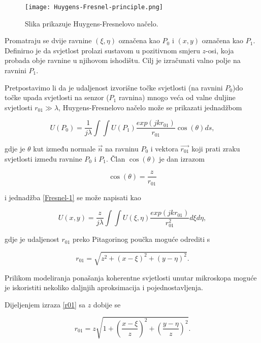 \documentclass[times, utf8, diplomski, numeric]{fer}
\begin{document}
\begin{figure}[h]
	\texttt{[image: Huygens-Fresnel-principle.png]}
	\centering
	\caption{Slika prikazuje Huygens-Fresnelovo načelo.}
	\label{Huygens-Fresnel-principle}
\end{figure}

Promatraju se dvije ravnine $(\xi,\eta)$ označena kao $P_0$ i $(x,y)$ označena kao $P_1$. Definirno je da svjetlost prolazi sustavom u pozitivnom smjeru $z$-osi, koja probada obje ravnine u njihovom ishodištu. Cilj je izračunati valno polje na ravnini $P_1$. 

Pretpostavimo li da je udaljenost izvorišne točke svjetlosti (na ravnini $P_0$)do točke upada svjetlosti na senzor ($P_1$ ravnina) mnogo veća od valne duljine svjetlosti $r_{01} \gg \lambda$, Huygens-Fresnelovo načelo može se prikazati jednadžbom

\begin{equation}
	\label{Fresnel-1}
	U(P_0) = \frac{1}{j\lambda}\int\int U(P_1)\frac{exp(jkr_{01})}{r_{01}}\cos(\theta)ds,
\end{equation}

gdje je $\theta$ kut između normale $\vec{n}$ na ravninu $P_0$ i vektora $\vec{r_{01}}$ koji prati zraku svjetlosti između ravnine $P_0$ i $P_1$. 
Član $\cos(\theta)$ je dan izrazom

\begin{equation}
	\label{cos_theta}
	\cos(\theta) = \frac{z}{r_{01}}
\end{equation}

i jednadžba \ref{Fresnel-1} se može napisati kao

\begin{equation}
\label{Fresnel-2}
U(x,y) = \frac{z}{j\lambda}\int\int U(\xi,\eta)\frac{exp(jkr_{01})}{r_{01}^2}d\xi d\eta,
\end{equation}

gdje je udaljenost $r_{01}$ preko Pitagorinog poučka moguće odrediti s

\begin{equation}
\label{r01}
r_{01} = \sqrt{z^2 + (x - \xi)^2 + (y - \eta)^2}.
\end{equation}

Prilikom modeliranja ponašanja koherentne svjetlosti unutar mikroskopa moguće je iskoristiti nekoliko daljnjih aproksimacija i pojednostavljenja. 

Dijeljenjem izraza \ref{r01} sa $z$ dobije se

\begin{equation}
\label{r01_divided}
r_{01} = z\sqrt{1 + \left(\frac{x - \xi}{z}\right)^2 + \left(\frac{y - \eta}{z}\right)^2}.
\end{equation}
\end{document}

